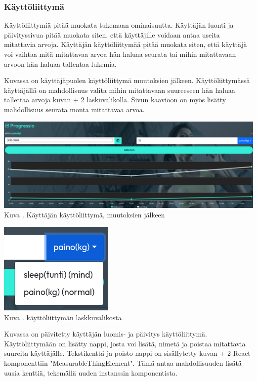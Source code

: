 \subsubsection{Käyttöliittymä}





Käyttöliittymiä pitää muokata tukemaan ominaisuutta.
Käyttäjän luonti ja päivityssivua pitää muokata siten, että käyttäjille voidaan antaa useita mitattavia arvoja.
Käyttäjän käyttöliittymää pitää muokata siten,
että käyttäjä voi vaihtaa mitä mitattavaa arvoa hän haluaa seurata tai mihin mitattavaan arvoon hän haluaa tallentaa lukemia.
\medskip

Kuvassa \nextImageCount{} on käyttäjäpuolen käyttöliittymä muutoksien jälkeen.
Käyttöliittymässä käyttäjällä on mahdollisuus valita mihin mitattavaan suureeseen hän haluaa tallettaa arvoja kuvan {\the\numexpr \theimgCounter + 2 } laskuvalikolla.
Sivun kaavioon on myös lisätty mahdollisuus seurata monta mitattavaa arvoa.
\medskip

\bigskip
\includegraphics[width = 15cm]{src/public/progressmulti.png}\\
Kuva \getImgCount {}. Käyttäjän käyttöliittymä, muutoksien jälkeen 
\medskip

\bigskip
\includegraphics{src/public/progressselect.png}\\
Kuva \getImgCount {}. käyttöliittymän laskkuvalikosta
\medskip



Kuvassa \nextImageCount {} on päivitetty käyttäjän luomis- ja päivitys käyttöliittymä.
Käyttöliittymään on lisätty nappi, josta voi lisätä, nimetä ja poistaa mitattavia suureita käyttäjälle.
Tekstikenttä ja poisto nappi on sisällytetty kuvan {\the\numexpr \theimgCounter + 2 } React komponenttiin "MeasurableThingElement". 
Tämä antaa mahdollisuuden lisätä uusia kenttiä, tekemällä uuden instanssin komponentista.
%

